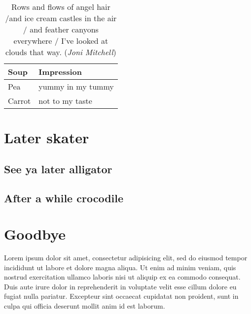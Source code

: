 \begin{table}
  \begin{center}
    \begin{tabular}{|l|l|}
      \hline
      Soup  & Impression\\
      \hline
      Pea  & yummy in my tummy\\
      Carrot & not to my taste\\
      \hline
    \end{tabular}
  \end{center}
  \caption[Food for thought]{\label{t:soup}  Rows and flows of angel hair /and ice cream castles in the air / and feather canyons everywhere / I've looked at clouds that way. (\emph{Joni Mitchell})}
\end{table}


\section{Later skater}

\subsection{See ya later alligator}
\subsection{After a while crocodile}

\section{Goodbye}

Lorem ipsum dolor sit amet, consectetur adipisicing elit, sed do
eiusmod tempor incididunt ut labore et dolore magna aliqua. Ut enim ad
minim veniam, quis nostrud exercitation ullamco laboris nisi ut
aliquip ex ea commodo consequat. Duis aute irure dolor in
reprehenderit in voluptate velit esse cillum dolore eu fugiat nulla
pariatur. Excepteur sint occaecat cupidatat non proident, sunt in
culpa qui officia deserunt mollit anim id est laborum.


